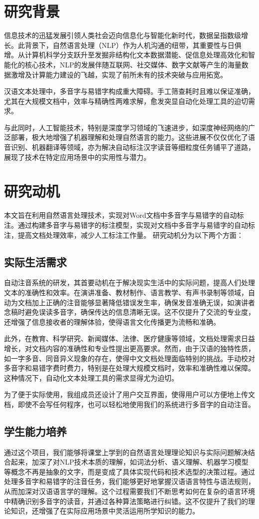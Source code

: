 \documentclass[12pt,hyperref,a4paper,UTF8]{ctexart}
\begin{document}
\section{研究背景}
信息技术的迅猛发展引领人类社会迈向信息化与智能化新时代，数据呈指数级增长。此背景下，自然语言处理（NLP）作为人机沟通的纽带，其重要性与日俱增。从计算机科学分支跃升至发掘非结构化文本数据潜能、促信息处理高效化和智能化的核心技术，NLP的发展伴随互联网、社交媒体、数字文献等产生的海量数据激增及计算能力建设的飞越，实现了前所未有的技术突破与应用拓宽。

汉语文本处理中，多音字与易错字构成重大障碍。手工筛查耗时且难以保证准确，尤其在大规模文档中，效率与精确性两难求解，愈发突显自动化处理工具的迫切需求。

与此同时，人工智能技术，特别是深度学习领域的飞速进步，如深度神经网络的广泛部署，极大地增强了机器理解和处理自然语言的能力。这些进展不仅仅优化了语音识别、机器翻译等领域，亦为解决自动标注汉字读音等细粒度任务铺平了道路，展现了技术在特定应用场景中的实用性与潜力。
\section{研究动机}
本文旨在利用自然语言处理技术，实现对Word文档中多音字与易错字的自动标注。通过构建多音字与易错字的标注模型，实现对文档中多音字与易错字的自动标注，提高文档处理效率，减少人工标注工作量。
研究动机分为以下两个方面：
\subsection{实际生活需求}
自动注音系统的研发，其首要动机在于解决现实生活中的实际问题，提高人们处理文本的准确性和效率。在演讲准备、教材制作、语言教学、有声书录制等领域，自动为文档加上正确的注音能够显著降低错误发生率，确保发音准确无误，如演讲者念稿时避免误读多音字，确保传达的信息清晰无误。这不仅提升了交流的专业度，还增强了信息接收者的理解体验，使得语言文化传播更为流畅和准确。

此外，在教育、科学研究、新闻媒体、法律、医疗健康等领域，文档处理需求日益增长，对文档内容的准确性和专业性提出更高要求。然而，由于汉语的独特性质，如一字多音、同音异义现象的存在，使得中文文档处理面临特别的挑战。手动校对多音字和易错字费时费力，特别是在处理大规模文档时，效率和准确性难以保障。这种情况下，自动化文本处理工具的需求显得尤为迫切。

为了便于实际使用，我组成员还设计了用户交互界面，使得用户可以方便地上传文档，即使不会写任何程序，也可以轻松地使用我们的系统进行多音字的自动注音。
\subsection{学生能力培养}
通过这个项目，我们能够将课堂上学到的自然语言处理理论知识与实际问题解决结合起来，加深了对NLP技术本质的理解，如词法分析、语义理解、机器学习模型等概念不再是抽象的文字，而是变成了具体实现代码和技术选型的决策过程。通过处理多音字和易错字的注音任务，我们能够更好地掌握汉语语言特性与语法规则，从而加深对汉语语言学的理解。这个过程需要我们不断思考如何在复杂的语言环境中精确识别多音字的读音，并通过各种算法策略进行纠错。这不仅提升了我们的理论知识，还增强了在实际应用场景中灵活运用所学知识的能力。
\end{document}
